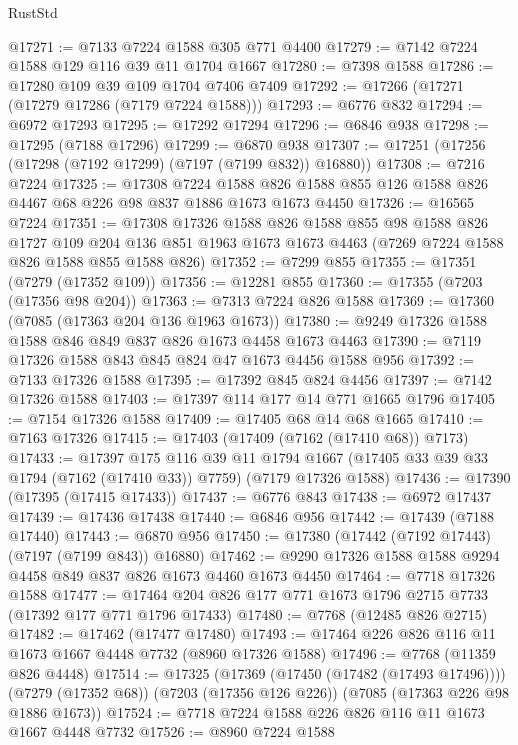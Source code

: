 \begin{lexlean}{RustStd}
\begin{coremodule}
@17271 := @7133 @7224 @1588 @305 @771 @4400
@17279 := @7142 @7224 @1588 @129 @116 @39 @11 @1704 @1667
@17280 := @7398 @1588
@17286 := @17280 @109 @39 @109 @1704 @7406 @7409
@17292 := @17266 (@17271 (@17279 @17286 (@7179 @7224 @1588)))
@17293 := @6776 @832
@17294 := @6972 @17293
@17295 := @17292 @17294
@17296 := @6846 @938
@17298 := @17295 (@7188 @17296)
@17299 := @6870 @938
@17307 := @17251 (@17256 (@17298 (@7192 @17299) (@7197 (@7199 @832)) @16880))
@17308 := @7216 @7224
@17325 := @17308
    @7224
    @1588
    @826
    @1588
    @855
    @126
    @1588
    @826
    @4467
    @68
    @226
    @98
    @837
    @1886
    @1673
    @1673
    @4450
@17326 := @16565 @7224
@17351 := @17308
    @17326
    @1588
    @826
    @1588
    @855
    @98
    @1588
    @826
    @1727
    @109
    @204
    @136
    @851
    @1963
    @1673
    @1673
    @4463
    (@7269 @7224 @1588 @826 @1588 @855 @1588 @826)
@17352 := @7299 @855
@17355 := @17351 (@7279 (@17352 @109))
@17356 := @12281 @855
@17360 := @17355 (@7203 (@17356 @98 @204))
@17363 := @7313 @7224 @826 @1588
@17369 := @17360 (@7085 (@17363 @204 @136 @1963 @1673))
@17380 := @9249 @17326 @1588 @1588 @846 @849 @837 @826 @1673 @4458 @1673 @4463
@17390 := @7119 @17326 @1588 @843 @845 @824 @47 @1673 @4456 @1588 @956
@17392 := @7133 @17326 @1588
@17395 := @17392 @845 @824 @4456
@17397 := @7142 @17326 @1588
@17403 := @17397 @114 @177 @14 @771 @1665 @1796
@17405 := @7154 @17326 @1588
@17409 := @17405 @68 @14 @68 @1665
@17410 := @7163 @17326
@17415 := @17403 (@17409 (@7162 (@17410 @68)) @7173)
@17433 := @17397
    @175
    @116
    @39
    @11
    @1794
    @1667
    (@17405 @33 @39 @33 @1794 (@7162 (@17410 @33)) @7759)
    (@7179 @17326 @1588)
@17436 := @17390 (@17395 (@17415 @17433))
@17437 := @6776 @843
@17438 := @6972 @17437
@17439 := @17436 @17438
@17440 := @6846 @956
@17442 := @17439 (@7188 @17440)
@17443 := @6870 @956
@17450 := @17380 (@17442 (@7192 @17443) (@7197 (@7199 @843)) @16880)
@17462 := @9290 @17326 @1588 @1588 @9294 @4458 @849 @837 @826 @1673 @4460 @1673 @4450
@17464 := @7718 @17326 @1588
@17477 := @17464 @204 @826 @177 @771 @1673 @1796 @2715 @7733 (@17392 @177 @771 @1796 @17433)
@17480 := @7768 (@12485 @826 @2715)
@17482 := @17462 (@17477 @17480)
@17493 := @17464 @226 @826 @116 @11 @1673 @1667 @4448 @7732 (@8960 @17326 @1588)
@17496 := @7768 (@11359 @826 @4448)
@17514 := @17325
    (@17369 (@17450 (@17482 (@17493 @17496))))
    (@7279 (@17352 @68))
    (@7203 (@17356 @126 @226))
    (@7085 (@17363 @226 @98 @1886 @1673))
@17524 := @7718 @7224 @1588 @226 @826 @116 @11 @1673 @1667 @4448 @7732
@17526 := @8960 @7224 @1588

\end{coremodule}
\end{lexlean}
